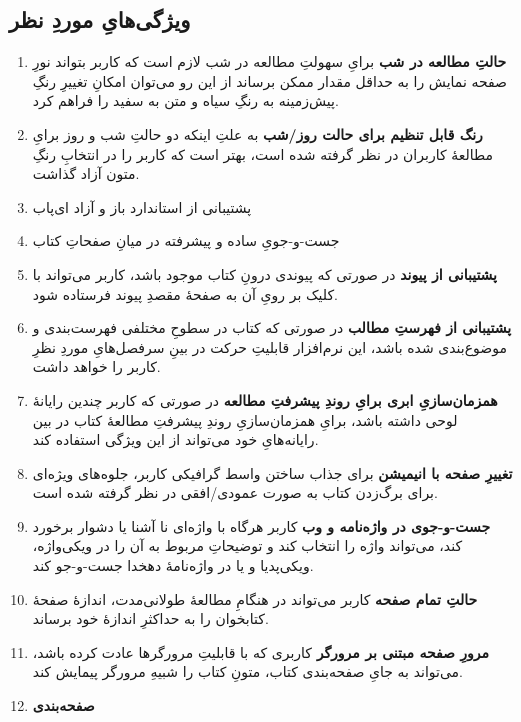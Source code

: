\documentclass[]{article}
\begin{document}
\subsection{ویژگی‌هایِ موردِ نظر}
\begin{enumerate}
	\item \textbf{حالتِ مطالعه در شب} 
برایِ سهولتِ مطالعه در شب لازم است که کاربر بتواند نورِ صفحه نمایش را به حداقل مقدار ممکن برساند از این رو می‌توان امکانِ تغییرِ رنگِ پیش‌زمینه به رنگِ سیاه و متن به سفید را فراهم کرد.
	\item \textbf{رنگ قابل تنظیم برای حالت روز/شب}
به علتِ اینکه دو حالتِ شب و روز برایِ مطالعهٔ کاربران در نظر گرفته شده است، بهتر است که کاربر را در انتخابِ رنگِ متون آزاد گذاشت.
	\item پشتیبانی از استاندارد باز و آزاد ای‌پاب
	\item جست-و-جویِ ساده و پیشرفته در میانِ صفحاتِ کتاب
	\item \textbf{پشتیبانی از پیوند}
در صورتی که پیوندی درونِ کتاب موجود باشد، کاربر می‌تواند با کلیک بر رویِ آن به صفحهٔ مقصدِ پیوند فرستاده شود.
	\item \textbf{پشتیبانی از فهرستِ مطالب}
در صورتی که کتاب در سطوحِ مختلفی فهرست‌بندی و موضوع‌بندی شده باشد، این نرم‌افزار قابلیتِ حرکت در بینِ سرفصل‌هایِ موردِ نظرِ کاربر را خواهد داشت.
	\item \textbf{همزمان‌سازیِ ابری برایِ روندِ پیشرفتِ مطالعه}
در صورتی که کاربر چندین رایانهٔ لوحی داشته باشد، برایِ همزمان‌سازیِ روندِ پیشرفتِ مطالعهٔ کتاب در بین رایانه‌هایِ خود می‌تواند از این ویژگی استفاده کند.
	\item \textbf{تغییرِ صفحه با انیمیشن}
برای جذاب ساختن واسط گرافیکی کاربر، جلوه‌های ویژه‌ای برای برگ‌زدن کتاب به صورت عمودی/افقی در نظر گرفته شده است.
	\item \textbf{جست-و-جوی در واژه‌نامه و وب}
کاربر هرگاه با واژه‌ای نا آشنا یا دشوار برخورد کند، می‌تواند واژه را انتخاب کند و توضیحاتِ مربوط به آن را در ویکی‌واژه، ویکی‌پدیا و یا در واژه‌نامهٔ دهخدا جست-و-جو کند.
	\item \textbf{حالتِ تمام صفحه}
کاربر می‌تواند در هنگامِ مطالعهٔ طولانی‌مدت، اندازهٔ صفحهٔ کتابخوان را به حداکثرِ اندازهٔ خود برساند.
	\item \textbf{مرورِ صفحه مبتنی بر مرورگر}
کاربری که با قابلیتِ مرورگرها عادت کرده باشد، می‌تواند به جایِ صفحه‌بندی کتاب، متونِ کتاب را شبیهِ مرورگر پیمایش کند.
	\item \textbf{صفحه‌بندی}

\end{enumerate}
\end{document}
